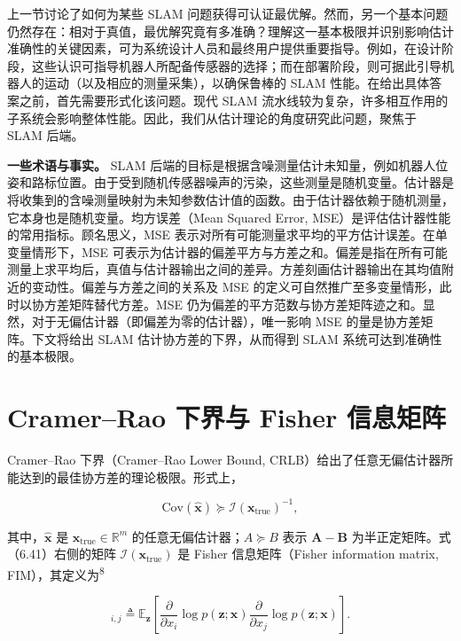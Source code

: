 上一节讨论了如何为某些 SLAM 问题获得可认证最优解。然而，另一个基本问题仍然存在：相对于真值，最优解究竟有多准确？理解这一基本极限并识别影响估计准确性的关键因素，可为系统设计人员和最终用户提供重要指导。例如，在设计阶段，这些认识可指导机器人所配备传感器的选择；而在部署阶段，则可据此引导机器人的运动（以及相应的测量采集），以确保鲁棒的 SLAM 性能。在给出具体答案之前，首先需要形式化该问题。现代 SLAM 流水线较为复杂，许多相互作用的子系统会影响整体性能。因此，我们从估计理论的角度研究此问题，聚焦于 SLAM 后端。

\textbf{一些术语与事实。} SLAM 后端的目标是根据含噪测量估计未知量，例如机器人位姿和路标位置。由于受到随机传感器噪声的污染，这些测量是随机变量。估计器是将收集到的含噪测量映射为未知参数估计值的函数。由于估计器依赖于随机测量，它本身也是随机变量。均方误差（Mean Squared Error, MSE）是评估估计器性能的常用指标。顾名思义，MSE 表示对所有可能测量求平均的平方估计误差。在单变量情形下，MSE 可表示为估计器的偏差平方与方差之和。偏差是指在所有可能测量上求平均后，真值与估计器输出之间的差异。方差刻画估计器输出在其均值附近的变动性。偏差与方差之间的关系及 MSE 的定义可自然推广至多变量情形，此时以协方差矩阵替代方差。MSE 仍为偏差的平方范数与协方差矩阵迹之和。显然，对于无偏估计器（即偏差为零的估计器），唯一影响 MSE 的量是协方差矩阵。下文将给出 SLAM 估计协方差的下界，从而得到 SLAM 系统可达到准确性的基本极限。

\section{Cramer--Rao 下界与 Fisher 信息矩阵}

Cramer--Rao 下界（Cramer--Rao Lower Bound, CRLB）给出了任意无偏估计器所能达到的最佳协方差的理论极限。形式上，

\begin{equation}
\mathrm{Cov} (\hat {\pmb {x}}) \succeq \mathcal {I} (\pmb {x} _ {\mathrm{true}}) ^ {- 1},\tag{6.41}
\end{equation}

其中，$\hat{\pmb{x}}$ 是 $\pmb { x } _ { \mathrm { true } } \in \mathbb { R } ^ { m }$ 的任意无偏估计器；$A \succeq B$ 表示 $\pmb { A } - \pmb { B }$ 为半正定矩阵。式（6.41）右侧的矩阵 $\mathcal { I } ( \pmb { x } _ { \mathrm { true } } )$ 是 Fisher 信息矩阵（Fisher information matrix, FIM），其定义为\textsuperscript{8}

\begin{equation}
[ \mathcal {I} (\pmb {x} _ {\mathrm{true}}) ] _ {i, j} \triangleq \mathbb {E} _ {\pmb {z}} \left[ \frac {\partial}{\partial x _ {i}} \log p (\pmb {z}; \pmb {x}) \frac {\partial}{\partial x _ {j}} \log p (\pmb {z}; \pmb {x}) \right].\tag{6.42}
\end{equation}

